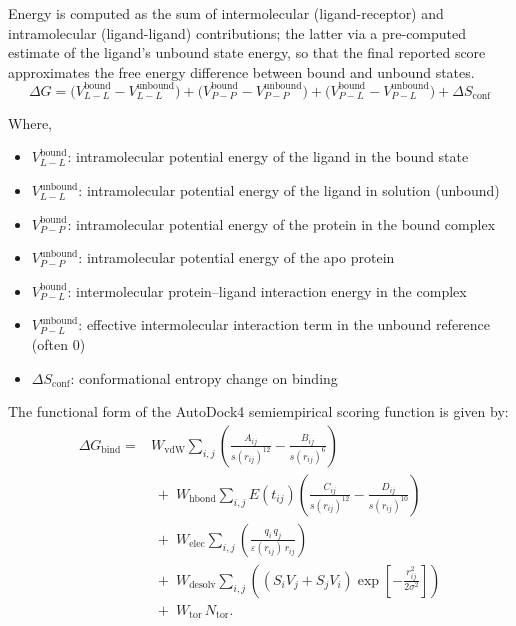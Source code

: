 \documentclass[12pt]{article}
\begin{document}
Energy is computed as the sum of intermolecular (ligand-receptor) and intramolecular (ligand-ligand) contributions; the latter via a pre-computed estimate of the ligand's unbound state energy, so that the final reported score approximates the free energy difference between bound and unbound states.
\begin{equation}
\Delta G =
\bigl( V_{L-L}^{\text{bound}} - V_{L-L}^{\text{unbound}} \bigr)
+
\bigl( V_{P-P}^{\text{bound}} - V_{P-P}^{\text{unbound}} \bigr)
+
\bigl( V_{P-L}^{\text{bound}} - V_{P-L}^{\text{unbound}} \bigr)
+
\Delta S_{\text{conf}}
\end{equation}


Where,
\begin{itemize}
 \item $V_{L-L}^{\textrm{bound}}$: intramolecular potential energy of the ligand in the bound state
 \item $V_{L-L}^{\textrm{unbound}}$: intramolecular potential energy of the ligand in solution (unbound)
\item $V_{P-P}^{\textrm{bound}}$: intramolecular potential energy of the protein in the bound complex
\item $V_{P-P}^{\textrm{unbound}}$: intramolecular potential energy of the apo protein
\item $V_{P-L}^{\textrm{bound}}$: intermolecular protein–ligand interaction energy in the complex
\item $V_{P-L}^{\textrm{unbound}}$: effective intermolecular interaction term in the unbound reference (often 0)
\item $\Delta S_{\textrm{conf}}$: conformational entropy change on binding
\end{itemize}

The functional form of the AutoDock4 semiempirical scoring function is given by: 
\begin{equation}
\label{eq:ad4_scoring}
\begin{aligned}
  \Delta G_{\text{bind}} = {} &
  W_{\textrm{vdW}}
  \sum_{i,j}
  \left(
    \frac{A_{ij}}{s(r_{ij})^{12}}
    - \frac{B_{ij}}{s(r_{ij})^{6}}
  \right)
  \\
  & \;+\;
  W_{\textrm{hbond}}
  \sum_{i,j}
  E(t_{ij})
  \left(
    \frac{C_{ij}}{s(r_{ij})^{12}}
    - \frac{D_{ij}}{s(r_{ij})^{10}}
  \right)
  \\
  & \;+\;
  W_{\textrm{elec}}
  \sum_{i,j}
  \left(
    \frac{q_i \, q_j}{\varepsilon(r_{ij}) \, r_{ij}}
  \right)
  \\
  & \;+\;
  W_{\textrm{desolv}}
  \sum_{i,j}
  \left(
    \left( S_i V_j + S_j V_i \right)
    \exp\left[
      - \frac{r_{ij}^2}{2 \sigma^2}
    \right]
  \right)
  \\
  & \;+\;
  W_{\textrm{tor}} \, N_{\textrm{tor}}.
\end{aligned}
\end{equation}
\end{document}
